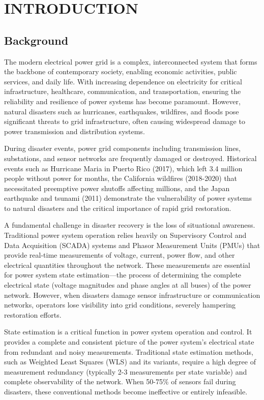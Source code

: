 \documentclass[12pt,a4paper]{report}
\begin{document}
\chapter{INTRODUCTION}

\section{Background}

The modern electrical power grid is a complex, interconnected system that forms the backbone of contemporary society, enabling economic activities, public services, and daily life. With increasing dependence on electricity for critical infrastructure, healthcare, communication, and transportation, ensuring the reliability and resilience of power systems has become paramount. However, natural disasters such as hurricanes, earthquakes, wildfires, and floods pose significant threats to grid infrastructure, often causing widespread damage to power transmission and distribution systems.

During disaster events, power grid components including transmission lines, substations, and sensor networks are frequently damaged or destroyed. Historical events such as Hurricane Maria in Puerto Rico (2017), which left 3.4 million people without power for months, the California wildfires (2018-2020) that necessitated preemptive power shutoffs affecting millions, and the Japan earthquake and tsunami (2011) demonstrate the vulnerability of power systems to natural disasters and the critical importance of rapid grid restoration.

A fundamental challenge in disaster recovery is the loss of situational awareness. Traditional power system operation relies heavily on Supervisory Control and Data Acquisition (SCADA) systems and Phasor Measurement Units (PMUs) that provide real-time measurements of voltage, current, power flow, and other electrical quantities throughout the network. These measurements are essential for power system state estimation—the process of determining the complete electrical state (voltage magnitudes and phase angles at all buses) of the power network. However, when disasters damage sensor infrastructure or communication networks, operators lose visibility into grid conditions, severely hampering restoration efforts.

State estimation is a critical function in power system operation and control. It provides a complete and consistent picture of the power system's electrical state from redundant and noisy measurements. Traditional state estimation methods, such as Weighted Least Squares (WLS) and its variants, require a high degree of measurement redundancy (typically 2-3 measurements per state variable) and complete observability of the network. When 50-75\% of sensors fail during disasters, these conventional methods become ineffective or entirely infeasible.
\end{document}
